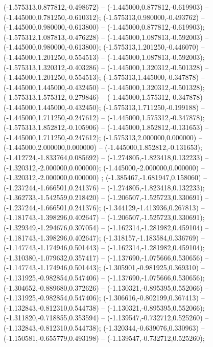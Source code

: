  (-1.575313,0.877812,-0.498672) -- (-1.445000,0.877812,-0.619903) -- (-1.445000,0.781250,-0.610312);
 (-1.575313,0.980000,-0.493762) -- (-1.445000,0.980000,-0.613800) -- (-1.445000,0.877812,-0.619903);
 (-1.575312,1.087813,-0.476228) -- (-1.445000,1.087813,-0.592003) -- (-1.445000,0.980000,-0.613800);
 (-1.575313,1.201250,-0.446070) -- (-1.445000,1.201250,-0.554513) -- (-1.445000,1.087813,-0.592003);
 (-1.575313,1.320312,-0.403286) -- (-1.445000,1.320312,-0.501328) -- (-1.445000,1.201250,-0.554513);
 (-1.575313,1.445000,-0.347878) -- (-1.445000,1.445000,-0.432450) -- (-1.445000,1.320312,-0.501328);
 (-1.575313,1.575312,-0.279846) -- (-1.445000,1.575312,-0.347878) -- (-1.445000,1.445000,-0.432450);
 (-1.575313,1.711250,-0.199188) -- (-1.445000,1.711250,-0.247612) -- (-1.445000,1.575312,-0.347878);
 (-1.575313,1.852812,-0.105906) -- (-1.445000,1.852812,-0.131653) -- (-1.445000,1.711250,-0.247612);
 (-1.575313,2.000000,0.000000) -- (-1.445000,2.000000,0.000000) -- (-1.445000,1.852812,-0.131653);
 (-1.412724,-1.833764,0.085692) -- (-1.274805,-1.823418,0.132233) -- (-1.320312,-2.000000,0.000000);
 (-1.445000,-2.000000,0.000000) -- (-1.320312,-2.000000,0.000000) ;
 (-1.385467,-1.681947,0.158060) -- (-1.237244,-1.666501,0.241376) -- (-1.274805,-1.823418,0.132233);
 (-1.362733,-1.542559,0.218420) -- (-1.206507,-1.525723,0.330691) -- (-1.237244,-1.666501,0.241376);
 (-1.344129,-1.413936,0.267813) -- (-1.181743,-1.398296,0.402647) -- (-1.206507,-1.525723,0.330691);
 (-1.329349,-1.294676,0.307054) -- (-1.162314,-1.281982,0.459104) -- (-1.181743,-1.398296,0.402647);
 (-1.318157,-1.183584,0.336769) -- (-1.147743,-1.174946,0.501443) -- (-1.162314,-1.281982,0.459104);
 (-1.310380,-1.079632,0.357417) -- (-1.137690,-1.075666,0.530656) -- (-1.147743,-1.174946,0.501443);
 (-1.305901,-0.981925,0.369310) -- (-1.131925,-0.982854,0.547406) -- (-1.137690,-1.075666,0.530656);
 (-1.304652,-0.889680,0.372626) -- (-1.130321,-0.895395,0.552066) -- (-1.131925,-0.982854,0.547406);
 (-1.306616,-0.802199,0.367413) -- (-1.132843,-0.812310,0.544738) -- (-1.130321,-0.895395,0.552066);
 (-1.311820,-0.718855,0.353594) -- (-1.139547,-0.732712,0.525260) -- (-1.132843,-0.812310,0.544738);
 (-1.320344,-0.639076,0.330963) -- (-1.150581,-0.655779,0.493198) -- (-1.139547,-0.732712,0.525260);
